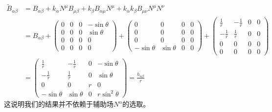 \documentclass[hyperref, UTF8, a4paper]{ctexart}
\begin{document}
\begin{equation*}
	\begin{aligned}
		\tilde{B}_{\alpha \beta } & =B_{\alpha \beta } +k_{\alpha } N^{\mu } B_{\mu \beta } +k_{\beta } B_{\alpha \mu } N^{\mu } +k_{\alpha } k_{\beta } B_{\mu \nu } N^{\mu } N^{\nu }\\
		& =B_{\alpha \beta } +\left(\begin{matrix}
			0 & 0 & 0 & -\sin \theta \\
			0 & 0 & 0 & \sin \theta \\
			0 & 0 & 0 & 0\\
			0 & 0 & 0 & 0
		\end{matrix}\right) +\left(\begin{matrix}
			0 & 0 & 0 & 0\\
			0 & 0 & 0 & 0\\
			0 & 0 & 0 & 0\\
			-\sin \theta  & \sin \theta  & 0 & 0
		\end{matrix}\right) +\left(\begin{matrix}
			\frac{1}{r} & -\frac{1}{r} & 0 & 0\\
			-\frac{1}{r} & \frac{1}{r} & 0 & 0\\
			0 & 0 & 0 & 0\\
			0 & 0 & 0 & 0
		\end{matrix}\right)\\
		& =\left(\begin{matrix}
			\frac{1}{r} & -\frac{1}{r} & 0 & -\sin \theta \\
			-\frac{1}{r} & \frac{1}{r} & 0 & \sin \theta \\
			0 & 0 & r & 0\\
			-\sin \theta  & \sin \theta  & 0 & r\sin^{2} \theta 
		\end{matrix}\right) =\frac{h_{\alpha \beta }}{r}
	\end{aligned}
\end{equation*}
这说明我们的结果并不依赖于辅助场$N^{\alpha }$的选取。
\end{document}
